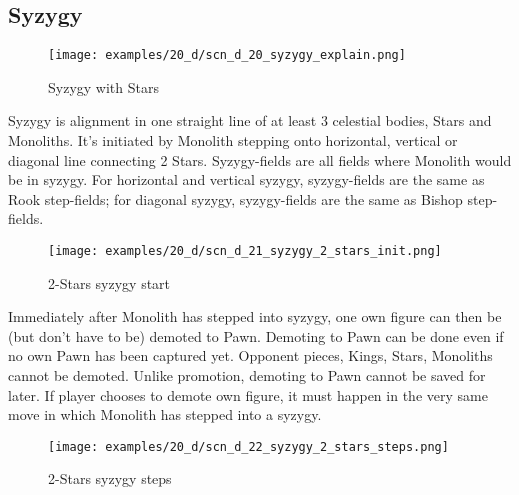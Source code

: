 \subsection*{Syzygy}
\label{sec:Discovery/Monolith/Syzygy}

\vspace*{-1.4\baselineskip}
\noindent
\begin{figure}[!h]
\texttt{[image: examples/20\_d/scn\_d\_20\_syzygy\_explain.png]}
\caption{Syzygy with Stars}
\label{fig:scn_d_20_syzygy_explain}
\end{figure}

Syzygy is alignment in one straight line of at least 3 celestial bodies, Stars and
Monoliths. It's initiated by Monolith stepping onto horizontal, vertical or diagonal
line connecting 2 Stars. Syzygy-fields are all fields where Monolith would be in
syzygy. For horizontal and vertical syzygy, syzygy-fields are the same as Rook
step-fields; for diagonal syzygy, syzygy-fields are the same as Bishop step-fields.

\clearpage %

\noindent
\begin{figure}[!h]
\texttt{[image: examples/20\_d/scn\_d\_21\_syzygy\_2\_stars\_init.png]}
\caption{2-Stars syzygy start}
\label{fig:scn_d_21_syzygy_2_stars_init}
\end{figure}

Immediately after Monolith has stepped into syzygy, one own figure can then be (but
don't have to be) demoted to Pawn. Demoting to Pawn can be done even if no own Pawn
has been captured yet. Opponent pieces, Kings, Stars, Monoliths cannot be demoted.
Unlike promotion, demoting to Pawn cannot be saved for later. If player chooses to
demote own figure, it must happen in the very same move in which Monolith has
stepped into a syzygy.

\clearpage %

\noindent
\begin{figure}[!h]
\texttt{[image: examples/20\_d/scn\_d\_22\_syzygy\_2\_stars\_steps.png]}
\caption{2-Stars syzygy steps}
\label{fig:scn_d_22_syzygy_2_stars_steps}
\end{figure}

